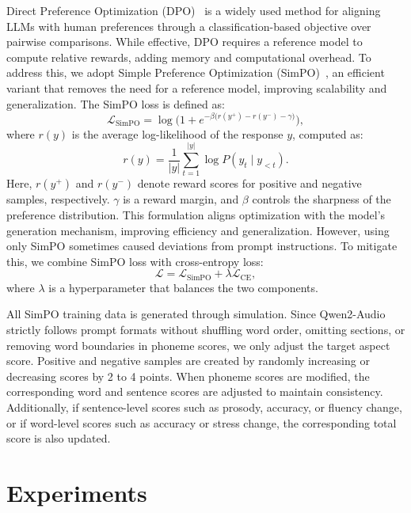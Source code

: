 \documentclass{article}
\begin{document}
Direct Preference Optimization (DPO)~\cite{Rafailov2023DPO} is a widely used method for aligning LLMs with human preferences through a classification-based objective over pairwise comparisons. While effective, DPO requires a reference model to compute relative rewards, adding memory and computational overhead. To address this, we adopt Simple Preference Optimization (SimPO)~\cite{Meng2024SimPO}, an efficient variant that removes the need for a reference model, improving scalability and generalization. The SimPO loss is defined as:
\begin{equation}
\mathcal{L}_{\text{SimPO}} = \log\!\Big(1 + e^{-\beta \big(r(y^+) - r(y^-) - \gamma\big)}\Big),
\end{equation}
\noindent where $r(y)$ is the average log-likelihood of the response $y$, computed as:
\begin{equation}
    r(y) = \frac{1}{|y|} \sum_{t=1}^{|y|} \log P(y_t \mid y_{<t}).
\end{equation}
\noindent Here, $r(y^+)$ and $r(y^-)$ denote reward scores for positive and negative samples, respectively. $\gamma$ is a reward margin, and $\beta$ controls the sharpness of the preference distribution. This formulation aligns optimization with the model's generation mechanism, improving efficiency and generalization. However, using only SimPO sometimes caused deviations from prompt instructions. To mitigate this, we combine SimPO loss with cross-entropy loss:
\begin{equation}
\mathcal{L} = \mathcal{L}_{\text{SimPO}} + \lambda\mathcal{L}_{\text{CE}},
\end{equation}
where $\lambda$ is a hyperparameter that balances the two components.

All SimPO training data is generated through simulation. Since Qwen2-Audio strictly follows prompt formats without shuffling word order, omitting sections, or removing word boundaries in phoneme scores, we only adjust the target aspect score. Positive and negative samples are created by randomly increasing or decreasing scores by 2 to 4 points. When phoneme scores are modified, the corresponding word and sentence scores are adjusted to maintain consistency. Additionally, if sentence-level scores such as prosody, accuracy, or fluency change, or if word-level scores such as accuracy or stress change, the corresponding total score is also updated.

\section{Experiments}
\label{sec:experiments}
\end{document}
